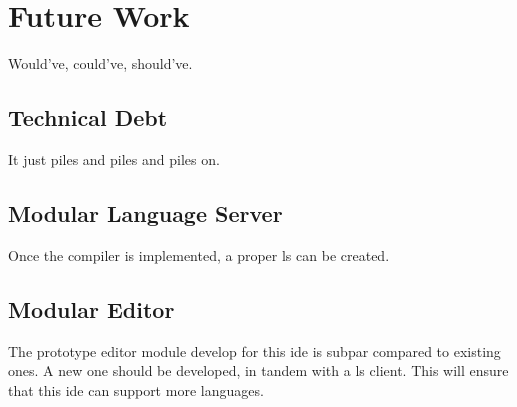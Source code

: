 \chapter{Future Work}

Would've, could've, should've.


\section{Technical Debt}

It just piles and piles and piles on.

\section{Modular Language Server}

Once the compiler \cite{wiig} is implemented, a proper \gls{ls} can be created.

\section{Modular Editor}

The prototype editor module develop for this \gls{ide} is subpar compared to
existing ones. A new one should be developed, in tandem with a \gls{ls} client.
This will ensure that this \gls{ide} can support more languages.